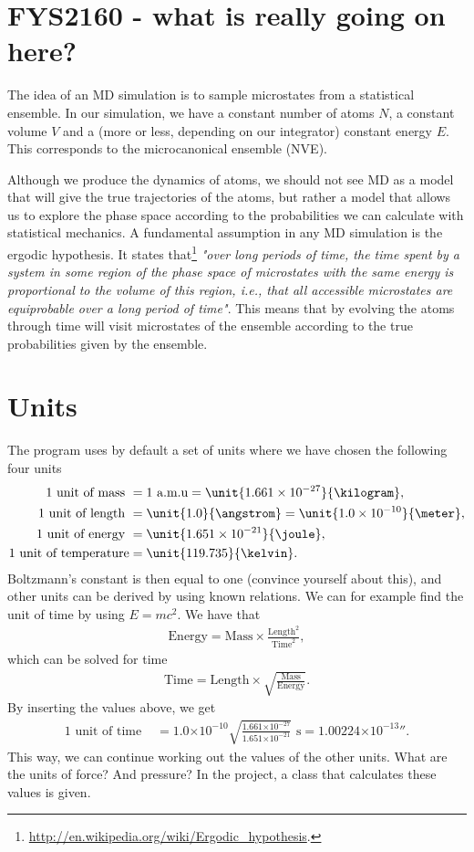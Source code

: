\documentclass[a4wide,12pt]{article}
\providecommand{\e}[1]{\ensuremath{\times 10^{#1}}}
\begin{document}
\begin{appendices}
\section{FYS2160 - what is really going on here?}
The idea of an MD simulation is to sample microstates from a statistical ensemble. In our simulation, we have a constant number of atoms $N$, a constant volume $V$ and a (more or less, depending on our integrator) constant energy $E$. This corresponds to the microcanonical ensemble (NVE). 

Although we produce the dynamics of atoms, we should not see MD as a model that will give the true trajectories of the atoms, but rather a model that allows us to explore the phase space according to the probabilities we can calculate with statistical mechanics. A fundamental assumption in any MD simulation is the ergodic hypothesis. It states that\footnote{\url{http://en.wikipedia.org/wiki/Ergodic_hypothesis}.} \textit{"over long periods of time, the time spent by a system in some region of the phase space of microstates with the same energy is proportional to the volume of this region, i.e., that all accessible microstates are equiprobable over a long period of time"}. This means that by evolving the atoms through time will visit microstates of the ensemble according to the true probabilities given by the ensemble.

\section{Units}
\label{sec:units}
The program uses by default a set of units where we have chosen the following four units
\begin{align}
	\text{1 unit of mass } &= 1 \text{ a.m.u} = \unit{1.661\e{-27}}{\kilogram},\\
	\text{1 unit of length } &= \unit{1.0}{\angstrom} = \unit{1.0\e{-10}}{\meter},\\
	\text{1 unit of energy } &= \unit{1.651\e{-21}}{\joule},\\
	\text{1 unit of temperature} &= \unit{119.735}{\kelvin}.
\end{align}
Boltzmann's constant is then equal to one (convince yourself about this), and other units can be derived by using known relations. We can for example find the unit of time by using $E=mc^2$. We have that
\begin{align}
	\text{Energy} = \text{Mass} \times \frac{\text{Length}^2}{\text{Time}^2},
\end{align}
which can be solved for time
\begin{align}
	\text{Time} = \text{Length} \times \sqrt{\frac{\text{Mass}}{\text{Energy}}}.
\end{align}
By inserting the values above, we get 
\begin{align}
	\text{1 unit of time } &= 1.0 \e{-10}\sqrt{\frac{1.661\e{-27}}{1.651\e{-21}}} \text{ s} = \unit{1.00224\e{-13}}{\second}.
\end{align}
This way, we can continue working out the values of the other units. What are the units of force? And pressure? In the project, a class that calculates these values is given.


\end{appendices}
\end{document}
